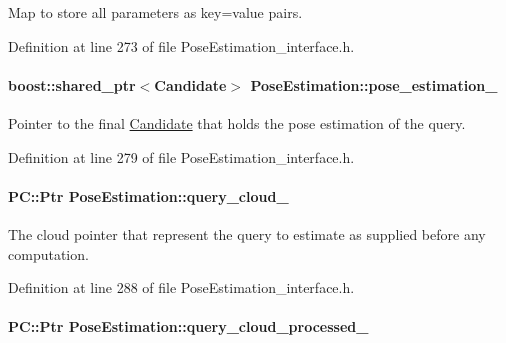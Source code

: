 Map to store all parameters as key=value pairs. 



Definition at line 273 of file Pose\-Estimation\-\_\-interface.\-h.

\hypertarget{classPoseEstimation_a75dc35326ae05d9b6de34537fe1df943}{
\paragraph[{pose\-\_\-estimation\-\_\-}]{\setlength{\rightskip}{0pt plus 5cm}boost\-::shared\-\_\-ptr$<${\bf Candidate}$>$ Pose\-Estimation\-::pose\-\_\-estimation\-\_\-\hspace{0.3cm}{\ttfamily [private]}}}\label{classPoseEstimation_a75dc35326ae05d9b6de34537fe1df943}


Pointer to the final \hyperlink{classCandidate}{Candidate} that holds the pose estimation of the query. 



Definition at line 279 of file Pose\-Estimation\-\_\-interface.\-h.

\hypertarget{classPoseEstimation_a624150566f5f26ef20a526dc2580a0c1}{
\paragraph[{query\-\_\-cloud\-\_\-}]{\setlength{\rightskip}{0pt plus 5cm}P\-C\-::\-Ptr Pose\-Estimation\-::query\-\_\-cloud\-\_\-\hspace{0.3cm}{\ttfamily [private]}}}\label{classPoseEstimation_a624150566f5f26ef20a526dc2580a0c1}


The cloud pointer that represent the query to estimate as supplied before any computation. 



Definition at line 288 of file Pose\-Estimation\-\_\-interface.\-h.

\hypertarget{classPoseEstimation_a8a08b75a2df62953f533b44cb45c69e3}{
\paragraph[{query\-\_\-cloud\-\_\-processed\-\_\-}]{\setlength{\rightskip}{0pt plus 5cm}P\-C\-::\-Ptr Pose\-Estimation\-::query\-\_\-cloud\-\_\-processed\-\_\-\hspace{0.3cm}{\ttfamily [private]}}}\label{classPoseEstimation_a8a08b75a2df62953f533b44cb45c69e3}


